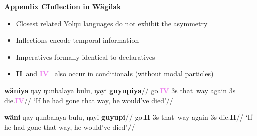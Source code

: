 \documentclass[dvipsnames]{beamer}%
\newcommand{\II}{\textbf{\textcolor{ochre}{II}}}
\newcommand{\IV}{\textbf{\textcolor{violet}{IV}}}
\begin{document}
\begin{frame}{\textbf{Appendix C\hfill Inflection in Wägilak}}
	\begin{itemize}
		\item Closest related Yolŋu languages do not exhibit the asymmetry
		\item Inflections encode temporal information
		\item Imperatives formally identical to declaratives
		\item \II~and \IV~ also occur in conditionals (without modal particles)
	\end{itemize}
	
	
	\ex \begingl\gla {}\textbf{wäniya} ŋay ŋunbalaya bulu, ŋayi \textbf{guyupiya}//
	\glb go.\IV{} 3s that~way again 3s die.\IV//
	\glft`If he had gone that way, he would've died'//\endgl\xe
	
	
	\ex \begingl\gla {}\textbf{wäni} ŋay ŋunbalaya bulu, ŋayi \textbf{guyupi}//
	\glb go.\II{} 3s that~way again 3s die.\II//
	\glft`If he had gone that way, he would've died'//\endgl\xe
	
	
\end{frame}
\end{document}
